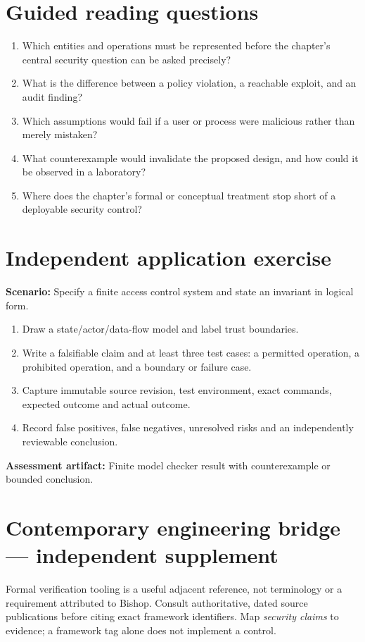 \documentclass[10pt,letterpaper]{article}
\begin{document}
\section{Guided reading questions}
\begin{enumerate}
\item Which entities and operations must be represented before the chapter's central security question can be asked precisely?
\item What is the difference between a policy violation, a reachable exploit, and an audit finding?
\item Which assumptions would fail if a user or process were malicious rather than merely mistaken?
\item What counterexample would invalidate the proposed design, and how could it be observed in a laboratory?
\item Where does the chapter's formal or conceptual treatment stop short of a deployable security control?
\end{enumerate}
\section{Independent application exercise}
\textbf{Scenario:} Specify a finite access control system and state an invariant in logical form.
\begin{enumerate}
\item Draw a state/actor/data-flow model and label trust boundaries.
\item Write a falsifiable claim and at least three test cases: a permitted operation, a prohibited operation, and a boundary or failure case.
\item Capture immutable source revision, test environment, exact commands, expected outcome and actual outcome.
\item Record false positives, false negatives, unresolved risks and an independently reviewable conclusion.
\end{enumerate}
\textbf{Assessment artifact:} Finite model checker result with counterexample or bounded conclusion.
\section{Contemporary engineering bridge --- independent supplement}
Formal verification tooling is a useful adjacent reference, not terminology or a requirement attributed to Bishop. Consult authoritative, dated source publications before citing exact framework identifiers. Map \emph{security claims} to evidence; a framework tag alone does not implement a control.
\end{document}
